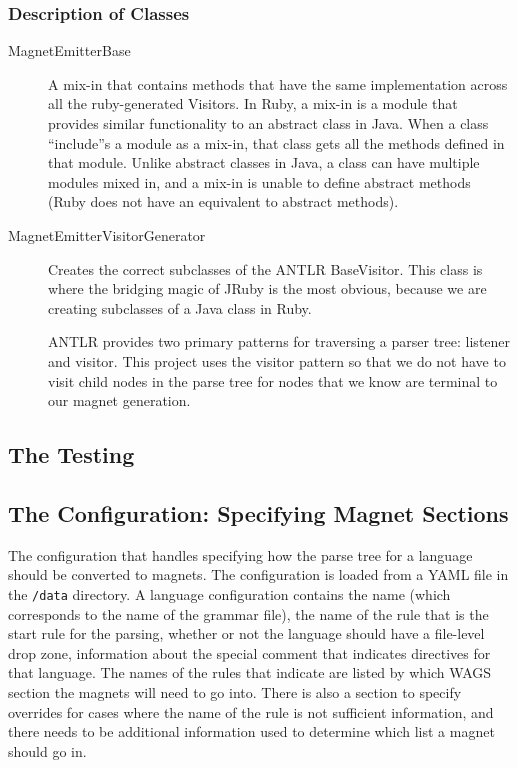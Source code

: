 \documentclass[letter,10pt]{article}
\begin{document}
\subsubsection{Description of Classes}

\begin{description}
 \item [MagnetEmitterBase] A mix-in that contains methods that have the 
same implementation across all the ruby-generated Visitors. In Ruby, a 
mix-in is a module that provides similar functionality to an abstract 
class in Java. When a class ``include''s a module as a mix-in, that 
class gets all the methods defined in that module. Unlike abstract 
classes in Java, a class can have multiple modules mixed in, and a 
mix-in is unable to define abstract methods (Ruby does not have an 
equivalent to abstract methods).

\item[MagnetEmitterVisitorGenerator] Creates the correct subclasses of 
the ANTLR BaseVisitor. This class is where the bridging magic of JRuby 
is the most obvious, because we are creating subclasses of a Java class 
in Ruby.

ANTLR provides two primary patterns for traversing a parser tree: 
listener and visitor. This project uses the visitor pattern so that we 
do not have to visit child nodes in the parse tree for nodes that we 
know are terminal to our magnet generation. 

\end{description}


\subsection{The Testing}

\subsection{The Configuration: Specifying Magnet Sections}
\label{sec:newConfig}

The configuration that handles specifying how the parse tree for a 
language should be converted to magnets. The configuration is loaded 
from a YAML file in the \verb~/data~ directory. A language 
configuration contains the name (which corresponds to the 
name of the grammar file), the name of the rule that is the start rule 
for the parsing, whether or not the language should have a file-level 
drop zone, information about the special comment that indicates 
directives for that language. The names of the rules that indicate are 
listed by which WAGS section the magnets will need to go into. There is 
also a section to specify overrides for cases where the name of the 
rule is not sufficient information, and there needs to be additional 
information used to determine which list a magnet should go in.
\end{document}
